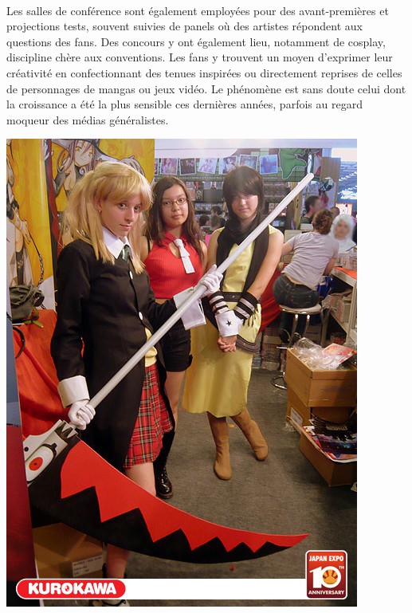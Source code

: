 \paragraph{}
Les salles de conférence sont également employées pour des avant-premières et projections tests, souvent suivies de panels où des artistes répondent aux questions des fans. Des concours y ont également lieu, notamment de cosplay, discipline chère aux conventions. Les fans y trouvent un moyen d’exprimer leur créativité en confectionnant des tenues inspirées ou directement reprises de celles de personnages de mangas ou jeux vidéo. Le phénomène est sans doute celui dont la croissance a été la plus sensible ces dernières années, parfois au regard moqueur des médias généralistes.
\begin{center}
\includegraphics[scale=0.3]{cosplay.jpg}
\end{center}
